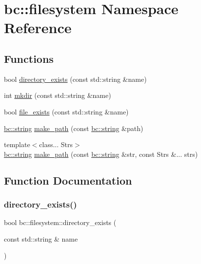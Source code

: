 \hypertarget{namespacebc_1_1filesystem}{}\section{bc\+:\+:filesystem Namespace Reference}
\label{namespacebc_1_1filesystem}
\subsection*{Functions}
\begin{DoxyCompactItemize}
\item 
bool \hyperlink{namespacebc_1_1filesystem_aa7ed56e4f2e9cc7305aa5819a8acc215}{directory\+\_\+exists} (const std\+::string \&name)
\item 
int \hyperlink{namespacebc_1_1filesystem_acf4ffc2a67e4f6c120dd465d60515773}{mkdir} (const std\+::string \&name)
\item 
bool \hyperlink{namespacebc_1_1filesystem_ab6e57f166ef958e7ffce32be6d58caa1}{file\+\_\+exists} (const std\+::string \&name)
\item 
\hyperlink{structbc_1_1string}{bc\+::string} \hyperlink{namespacebc_1_1filesystem_aff59293c3d3adb990d7527a863af0b28}{make\+\_\+path} (const \hyperlink{structbc_1_1string}{bc\+::string} \&path)
\item 
{\footnotesize template$<$class... Strs$>$ }\\\hyperlink{structbc_1_1string}{bc\+::string} \hyperlink{namespacebc_1_1filesystem_aca4cd8fad6039b34560ca608a548fc35}{make\+\_\+path} (const \hyperlink{structbc_1_1string}{bc\+::string} \&str, const Strs \&... strs)
\end{DoxyCompactItemize}


\subsection{Function Documentation}
\mbox{\label{namespacebc_1_1filesystem_aa7ed56e4f2e9cc7305aa5819a8acc215}} 
\subsubsection{\texorpdfstring{directory\+\_\+exists()}{directory\_exists()}}
{\footnotesize\ttfamily bool bc\+::filesystem\+::directory\+\_\+exists (\begin{DoxyParamCaption}\item[{const std\+::string \&}]{name }\end{DoxyParamCaption})\hspace{0.3cm}{\ttfamily [inline]}}

